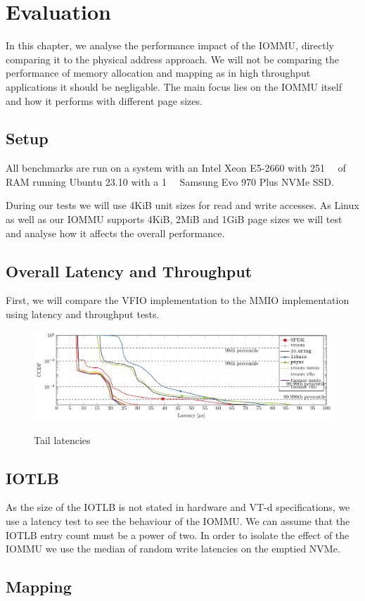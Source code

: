 \chapter{Evaluation}
In this chapter, we analyse the performance impact of the IOMMU, directly comparing it to the physical address approach. We will not be comparing the performance of memory allocation and mapping as in high throughput applications it should be negligable. The main focus lies on the IOMMU itself and how it performs with different page sizes. 

\section{Setup}
All benchmarks are run on a system with an Intel Xeon E5-2660 with \qty{251}{\gibi\byte} of RAM running Ubuntu 23.10 with a \qty{1}{\tera\byte} Samsung Evo 970 Plus NVMe SSD.

During our tests we will use 4KiB unit sizes for read and write accesses. 
As Linux as well as our IOMMU supports 4KiB, 2MiB and 1GiB page sizes we will test and analyse how it affects the overall performance.

\section{Overall Latency and Throughput}
First, we will compare the VFIO implementation to the MMIO implementation using latency and throughput tests.
\begin{figure}
    \centering
     {\includegraphics[width=\textwidth]{figures/latency-ccdf-write} \label{fig:ccdf-write}}
    \caption{Tail latencies}
    \label{fig:ccdf}
\end{figure}

\section{IOTLB}
As the size of the IOTLB is not stated in hardware and VT-d specifications, we use a latency test to see the behaviour of the IOMMU. We can assume that the IOTLB entry count must be a power of two. In order to isolate the effect of the IOMMU we use the median of random write latencies on the emptied NVMe.


\section{Mapping}